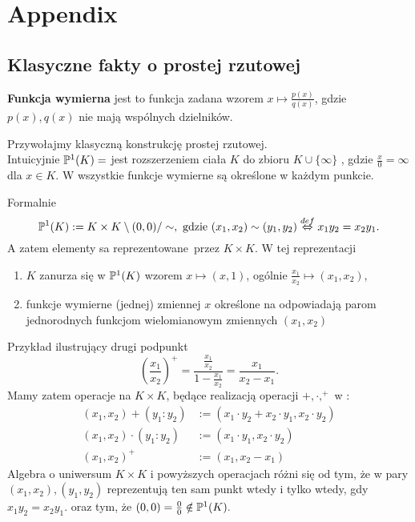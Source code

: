 \section{Appendix}

\subsection{Klasyczne fakty o prostej rzutowej}
\begin{df}
	\textbf{Funkcja wymierna} jest to funkcja zadana wzorem $x \mapsto \frac{p(x)}{q(x)}$, gdzie $p(x), q(x)$ nie mają wspólnych dzielników.
\end{df}
Przywołajmy klasyczną konstrukcję prostej rzutowej.
\\
Intuicyjnie $\mathbb{P}^{1}(K) =$ jest rozszerzeniem ciała $K$ do zbioru $K \cup \{ \infty \}$ , gdzie $\frac{x}{0} = \infty$ dla $x \in K$. W  wszystkie funkcje wymierne są określone w każdym punkcie.

Formalnie 
$$
\mathbb{P}^{1}(K) := K \times K \setminus (0,0) / \sim, \text{ gdzie } (x_1, x_2) \sim (y_1, y_2) \stackrel{def}{\Leftrightarrow} x_1y_2 = x_2y_1.
$$
A zatem elementy  sa reprezentowane przez $K \times K$. W tej reprezentacji 
\begin{enumerate}
	\item $K$ zanurza się w $\mathbb{P}^{1}(K)$ wzorem $x \mapsto (x, 1)$, ogólnie $\frac{x_1}{x_2} \mapsto (x_1, x_2)$,
	\item funkcje wymierne (jednej) zmiennej $x$ określone na  odpowiadają parom jednorodnych funkcjom wielomianowym zmiennych $(x_1, x_2)$
\end{enumerate}
Przykład ilustrujący drugi podpunkt
\[
	\left( \frac{x_1}{x_2} \right)^+=\frac{\frac{x_1}{x_2}}{1-\frac{x_1}{x_2}} = \frac{x_1}{ x_2 - x_1}.
\]
Mamy zatem operacje na $K \times K$, będące realizacją operacji $+, \cdot, ^+$ w : 
\begin{subequations}
	\renewcommand{\theequation}{\theparentequation.\arabic{equation}}
	\begin{align}\label{eq::ProjJakoKtimesK1}
	(x_1, x_2) + (y_1:y_2) &:= (x_1 \cdot y_2 + x_2 \cdot y_1, x_2 \cdot y_2)\\
	(x_1, x_2) \cdot (y_1:y_2) &:= (x_1 \cdot y_1, x_2 \cdot y_2) \\
	(x_1, x_2)^+      &:= (x_1, x_2 -x_1) \label{eq::ProjJakoKtimesK3}
	\end{align}
\end{subequations}
Algebra o uniwersum $K \times K$ i powyższych operacjach różni się od  tym, że w  pary $(x_1, x_2), (y_1, y_2)$ reprezentują ten sam punkt wtedy i tylko wtedy, gdy $ x_1y_2 = x_2y_1.$ oraz tym, że $(0, 0) = \frac{0}{0} \notin \mathbb{P}^{1}(K).$

